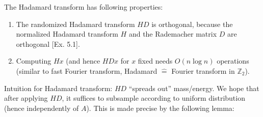 \begin{remark*}
The Hadamard transform has following properties:\vspace{-0.5pc}
\begin{enumerate}[itemsep=0pt]
\item The randomized Hadamard transform $HD$ is orthogonal, because the normalized Hadamard transform $H$ and the Rademacher matrix $D$ are orthogonal [Ex. 5.1].
\item Computing $Hx$ (and hence $HDx$ for $x$ fixed needs $O(n\log n)$ operations (similar to fast Fourier transform, Hadamard $\hat{=}$ Fourier transform in $\mathbb{Z}_2$).
\end{enumerate}
\end{remark*}
Intuition for Hadamard transform: $HD$ ``spreads out'' mass/energy. We hope that after applying $HD$, it suffices to subsample according to uniform distribution (hence independently of $A$). This is made precise by the following lemma:\\
\drawaline
{} \vspace{-1pc}
